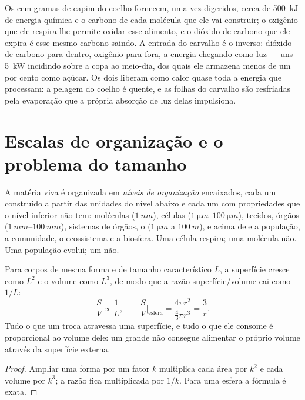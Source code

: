 \begin{example}\label{ex:b1:organism-environment:rabbitoak}
Os cem gramas de capim do coelho fornecem, uma vez digeridos, cerca de
\qty{500}{kJ} de energia química e o carbono de cada molécula que ele
vai construir; o oxigênio que ele respira lhe permite oxidar esse
alimento, e o dióxido de carbono que ele expira é esse mesmo carbono
saindo. A entrada do carvalho é o inverso: dióxido de carbono para
dentro, oxigênio para fora, a energia chegando como luz --- uns
\qty{5}{kW} incidindo sobre a copa ao meio-dia, dos quais ele armazena
menos de um por cento como açúcar. Os dois liberam como calor quase toda
a energia que processam: a pelagem do coelho é quente, e as folhas do
carvalho são resfriadas pela evaporação que a própria absorção de luz
delas impulsiona.
\end{example}

\section{Escalas de organização e o problema do tamanho}

\begin{definition}\label{def:b1:organism-environment:levels}
A matéria viva é organizada em \emph{níveis de organização}
encaixados, cada um construído a partir das unidades do nível abaixo e
cada um com propriedades que o nível inferior não tem: moléculas
($\qty{1}{nm}$), células ($\qtyrange{1}{100}{\micro m}$), tecidos,
órgãos ($\qtyrange{1}{100}{mm}$), sistemas de órgãos, o 
($\qty{1}{\micro m}$ a $\qty{100}{m}$), e acima dele a população, a
comunidade, o ecossistema e a biosfera. Uma célula respira; uma molécula
não. Uma população evolui; um  não.
\end{definition}

\begin{proposition}\label{prop:b1:organism-environment:sv}
Para corpos de mesma forma e de tamanho característico $L$, a superfície
cresce como $L^2$ e o volume como $L^3$, de modo que a razão
superfície/volume cai como $1/L$:
\[
\frac{S}{V} \propto \frac{1}{L}, \qquad
\frac{S}{V}\Big|_{\text{esfera}} = \frac{4\pi r^2}{\tfrac{4}{3}\pi r^3} = \frac{3}{r}.
\]
Tudo o que um  troca atravessa uma superfície, e tudo o que ele
consome é proporcional ao volume dele: um  grande não consegue
alimentar o próprio volume através da superfície externa.
\end{proposition}
\begin{proof}
Ampliar uma forma por um fator $k$ multiplica cada área por $k^2$ e cada
volume por $k^3$; a razão fica multiplicada por $1/k$. Para uma esfera a
fórmula é exata.
\end{proof}

